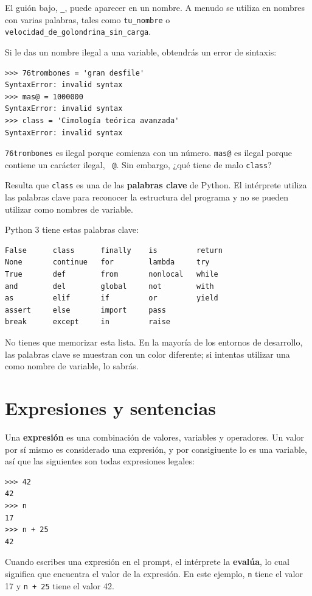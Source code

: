\documentclass[10pt]{book}
\begin{document}
El guión bajo, \verb"_", puede aparecer en un nombre.
A menudo se utiliza en nombres con varias palabras, tales como
\verb"tu_nombre" o \verb"velocidad_de_golondrina_sin_carga".

Si le das un nombre ilegal a una variable, obtendrás un error de sintaxis:

\begin{verbatim}
>>> 76trombones = 'gran desfile'
SyntaxError: invalid syntax
>>> mas@ = 1000000
SyntaxError: invalid syntax
>>> class = 'Cimología teórica avanzada'
SyntaxError: invalid syntax
\end{verbatim}
%
{\tt 76trombones} es ilegal porque comienza con un número.
{\tt mas@} es ilegal porque contiene un carácter ilegal, {\tt
@}.  Sin embargo, ¿qué tiene de malo {\tt class}?

Resulta que {\tt class} es una de las {\bf palabras clave} de Python.  El
intérprete utiliza las palabras clave para reconocer la estructura del programa
y no se pueden utilizar como nombres de variable.

Python 3 tiene estas palabras clave:

\begin{verbatim}
False      class      finally    is         return
None       continue   for        lambda     try
True       def        from       nonlocal   while
and        del        global     not        with
as         elif       if         or         yield
assert     else       import     pass
break      except     in         raise
\end{verbatim}
%
No tienes que memorizar esta lista.  En la mayoría de los entornos de desarrollo,
las palabras clave se muestran con un color diferente; si intentas utilizar una
como nombre de variable, lo sabrás.


\section{Expresiones y sentencias}

Una {\bf expresión} es una combinación de valores, variables y operadores.
Un valor por sí mismo es considerado una expresión, y por consigiuente lo es
una variable, así que las siguientes son todas expresiones legales:

\begin{verbatim}
>>> 42
42
>>> n
17
>>> n + 25
42
\end{verbatim}
%
Cuando escribes una expresión en el prompt, el intérprete
la {\bf evalúa}, lo cual significa que encuentra el valor de
la expresión.
En este ejemplo, {\tt n} tiene el valor 17 y
{\tt n + 25} tiene el valor 42.
\end{document}
